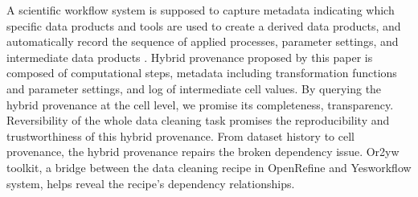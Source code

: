 A scientific workflow system is supposed to capture metadata indicating which specific data products and tools are used to create a derived data products, and automatically record the sequence of applied processes, parameter settings, and intermediate data products \cite{ludascher2006scientific}. Hybrid provenance proposed by this paper is composed of computational steps, metadata including transformation functions and parameter settings, and log of intermediate cell values. By querying the hybrid provenance at the cell level, we promise its completeness, transparency. Reversibility of the whole data cleaning task promises the reproducibility and trustworthiness of this hybrid provenance. From dataset history to cell provenance, the hybrid provenance repairs the broken dependency issue. Or2yw toolkit, a bridge between the data cleaning recipe in OpenRefine and Yesworkflow system, helps reveal the recipe's dependency relationships. 
